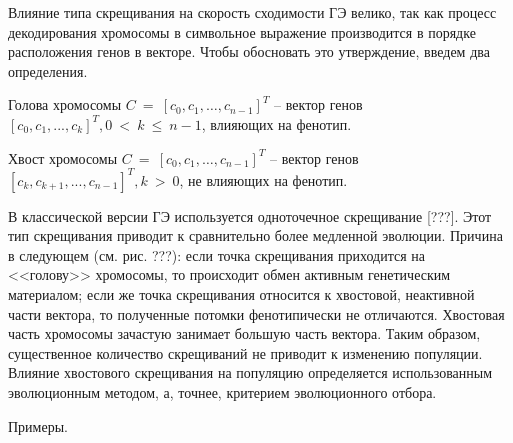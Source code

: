 Влияние типа скрещивания на скорость сходимости ГЭ велико, так как процесс декодирования хромосомы в символьное выражение производится в порядке расположения генов в векторе.
Чтобы обосновать это утверждение, введем два определения.

\begin{definition}
    Голова хромосомы $C~=~\left[c_0, c_1, \dots , c_{n-1} \right]^T$ -- вектор генов $\left[c_0, c_1, ..., c_k \right]^T, 0~<~k~\leq~n-1$, влияющих на фенотип.
\end{definition}

\begin{definition}
    Хвост хромосомы $C~=~\left[c_0, c_1, \dots , c_{n-1} \right]^T$ -- вектор генов $\left[c_k, c_{k+1}, ..., c_{n-1} \right]^T, k~>~0$, не влияющих на фенотип.
\end{definition}

В классической версии ГЭ используется одноточечное скрещивание [???]. 
Этот тип скрещивания приводит к сравнительно более медленной эволюции. %
Причина в следующем (см. рис. ???): если точка скрещивания приходится на <<голову>> хромосомы, то происходит обмен активным генетическим материалом; если же точка скрещивания относится к хвостовой, неактивной части вектора, то полученные потомки фенотипически не отличаются.
Хвостовая часть хромосомы зачастую занимает большую часть вектора.
Таким образом, существенное количество скрещиваний не приводит к изменению популяции.
Влияние хвостового скрещивания на популяцию определяется использованным эволюционным методом, а, точнее, критерием эволюционного отбора. 

Примеры.


\clearpage
